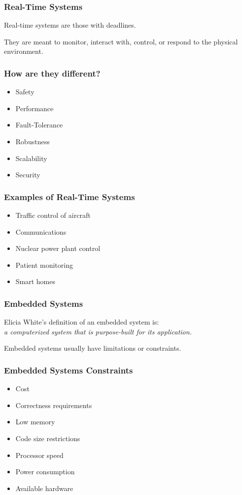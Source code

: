 \begin{frame}
\frametitle{Real-Time Systems}

Real-time systems are those with deadlines. 

They are meant to monitor, interact with, control, or respond to the physical environment.

\end{frame}

\begin{frame}
\frametitle{How are they different?}

\begin{itemize}
	\item Safety
	\item Performance
	\item Fault-Tolerance
	\item Robustness
	\item Scalability
	\item Security
\end{itemize}

\end{frame}

\begin{frame}
\frametitle{Examples of Real-Time Systems}

\begin{itemize}
	\item Traffic control of aircraft
	\item Communications
	\item Nuclear power plant control
	\item Patient monitoring
	\item Smart homes
\end{itemize}

\end{frame}

\begin{frame}
\frametitle{Embedded Systems}

Elicia White's definition of an embedded system is:\\
\quad \textit{a computerized system that is purpose-built for its application.}

Embedded systems usually have limitations or constraints.

\end{frame}

\begin{frame}
\frametitle{Embedded Systems Constraints}
\begin{itemize}
	\item Cost
	\item Correctness requirements
	\item Low memory
	\item Code size restrictions
	\item Processor speed
	\item Power consumption
	\item Available hardware
\end{itemize}
\end{frame}

